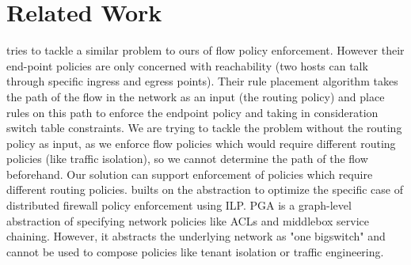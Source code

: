 \section{Related Work} \label{sec:relatedwork}

\cite{oneswitch} tries to tackle a similar problem to ours of flow policy enforcement. However their end-point policies are only concerned with reachability (two hosts can talk through specific ingress and egress points). Their rule placement algorithm takes the path of the flow in the network as an input (the routing policy) and place rules on this path to enforce the endpoint policy and taking in consideration switch table constraints. We are trying to tackle the problem without the routing policy as input, as we enforce flow policies which would require different routing policies (like traffic isolation), so we cannot determine the path of the flow beforehand. Our solution can support enforcement of policies which require different routing policies. \cite{distfirewall} builts on the \cite{oneswitch} abstraction to optimize the specific case of distributed firewall policy enforcement using ILP.  PGA  \cite{pga} is a graph-level abstraction of 
specifying network policies like ACLs and middlebox service chaining. However, it abstracts the underlying network as "one bigswitch" and 
cannot be used to compose policies like tenant isolation or traffic engineering.  

